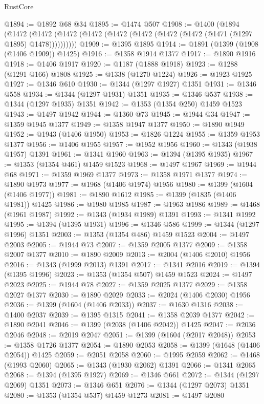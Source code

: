 \begin{lexlean}{RustCore}
\begin{coremodule}
{\begin{coremodule}
{{{{{{{{{{{{{{{{{{{{{{{{{{{{{{{{{{{{{{{{{{{{@1894 := @1892 @68 @34
@1895 := @1474 @507
@1908 := @1400
    (@1894
      (@1472 (@1472 (@1472 (@1472 (@1472 (@1472 (@1472 (@1472 (@1471 (@1297 @1895) @1478))))))))))
@1909 := @1395 @1895
@1914 := @1891 (@1399 (@1908 (@1406 @1909)) @1425)
@1916 := @1358 @1914 @1377
@1917 := @1890 @1916
@1918 := @1406 @1917
@1920 := @1187 (@1888 @1918)
@1923 := @1288 (@1291 @166) @1808
@1925 := @1338 (@1270 @1224)
@1926 := @1923 @1925
@1927 := @1346 @610
@1930 := @1344 (@1297 @1927) @1351
@1931 := @1346 @558
@1934 := @1344 (@1297 @1931) @1351
@1935 := @1346 @537
@1938 := @1344 (@1297 @1935) @1351
@1942 := @1353 (@1354 @250) @1459 @1523
@1943 := @1497 @1942
@1944 := @1360 @73
@1945 := @1944 @34
@1947 := @1359 @1945 @1377
@1949 := @1358 @1947 @1377
@1950 := @1890 @1949
@1952 := @1943 (@1406 @1950)
@1953 := @1826 @1224
@1955 := @1359 @1953 @1377
@1956 := @1406 @1955
@1957 := @1952 @1956
@1960 := @1343 (@1938 @1957) @1391
@1961 := @1341 @1960
@1963 := @1394 (@1395 @1935)
@1967 := @1353 (@1354 @461) @1459 @1523
@1968 := @1497 @1967
@1969 := @1944 @68
@1971 := @1359 @1969 @1377
@1973 := @1358 @1971 @1377
@1974 := @1890 @1973
@1977 := @1968 (@1406 @1974) @1956
@1980 := @1399 (@1604 (@1406 @1977))
@1981 := @1890 @1612
@1985 := @1399 (@1835 (@1406 @1981)) @1425
@1986 := @1980 @1985
@1987 := @1963 @1986
@1989 := @1468 (@1961 @1987)
@1992 := @1343 (@1934 @1989) @1391
@1993 := @1341 @1992
@1995 := @1394 (@1395 @1931)
@1996 := @1346 @586
@1999 := @1344 (@1297 @1996) @1351
@2003 := @1353 (@1354 @486) @1459 @1523
@2004 := @1497 @2003
@2005 := @1944 @73
@2007 := @1359 @2005 @1377
@2009 := @1358 @2007 @1377
@2010 := @1890 @2009
@2013 := @2004 (@1406 @2010) @1956
@2016 := @1343 (@1999 @2013) @1391
@2017 := @1341 @2016
@2019 := @1394 (@1395 @1996)
@2023 := @1353 (@1354 @507) @1459 @1523
@2024 := @1497 @2023
@2025 := @1944 @78
@2027 := @1359 @2025 @1377
@2029 := @1358 @2027 @1377
@2030 := @1890 @2029
@2033 := @2024 (@1406 @2030) @1956
@2036 := @1399 (@1604 (@1406 @2033))
@2037 := @1630 @1316
@2038 := @1400 @2037
@2039 := @1395 @1315
@2041 := @1358 @2039 @1377
@2042 := @1890 @2041
@2046 := @1399 (@2038 (@1406 @2042)) @1425
@2047 := @2036 @2046
@2048 := @2019 @2047
@2051 := @1399 (@1604 (@2017 @2048))
@2053 := @1358 @1726 @1377
@2054 := @1890 @2053
@2058 := @1399 (@1648 (@1406 @2054)) @1425
@2059 := @2051 @2058
@2060 := @1995 @2059
@2062 := @1468 (@1993 @2060)
@2065 := @1343 (@1930 @2062) @1391
@2066 := @1341 @2065
@2068 := @1394 (@1395 @1927)
@2069 := @1346 @661
@2072 := @1344 (@1297 @2069) @1351
@2073 := @1346 @651
@2076 := @1344 (@1297 @2073) @1351
@2080 := @1353 (@1354 @537) @1459 @1273
@2081 := @1497 @2080
}}}}}}}}}}}}}}}}}}}}}}}}}}}}}}}}}}}}}}}}}}}}
\end{coremodule}}
\end{coremodule}
\end{lexlean}
